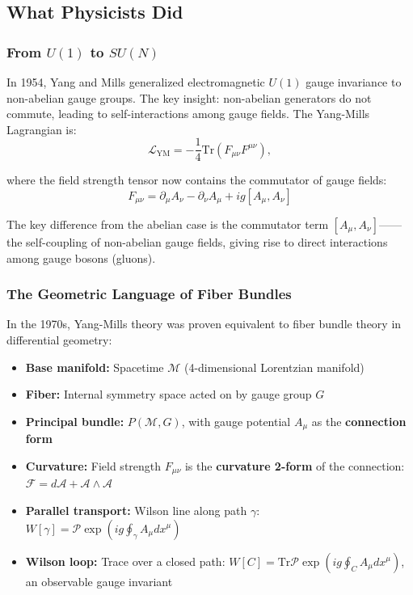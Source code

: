 \documentclass[12pt,a4paper]{article}
\theoremstyle{remark}
\newcommand{\Tr}{\mathrm{Tr}}
\begin{document}
\subsection{What Physicists Did}

\subsubsection{From $U(1)$ to $SU(N)$}

In 1954, Yang and Mills generalized electromagnetic $U(1)$ gauge invariance
to non-abelian gauge groups. The key insight: non-abelian generators do not commute,
leading to self-interactions among gauge fields. The Yang-Mills Lagrangian is:
\begin{equation}
    \mathcal{L}_{\text{YM}} = -\frac{1}{4} \Tr(F_{\mu\nu}F^{\mu\nu}),
\end{equation}

where the field strength tensor now contains the commutator of gauge fields:
\begin{equation}
    \boxed{F_{\mu\nu} = \partial_\mu A_\nu - \partial_\nu A_\mu + i g [A_\mu, A_\nu]}
    \label{eq:ym_fieldstrength}
\end{equation}

The key difference from the abelian case is the commutator term $[A_\mu, A_\nu]$——the self-coupling of non-abelian gauge fields,
giving rise to direct interactions among gauge bosons (gluons).

\subsubsection{The Geometric Language of Fiber Bundles}

In the 1970s, Yang-Mills theory was proven equivalent to fiber bundle
theory in differential geometry:

\begin{itemize}
    \item \textbf{Base manifold:} Spacetime $\mathcal{M}$ (4-dimensional Lorentzian manifold)
    \item \textbf{Fiber:} Internal symmetry space acted on by gauge group $G$
    \item \textbf{Principal bundle:} $P(\mathcal{M}, G)$, with gauge potential $A_\mu$ as the \textbf{connection form}
    \item \textbf{Curvature:} Field strength $F_{\mu\nu}$ is the \textbf{curvature 2-form} of the connection:
    $\mathcal{F} = d\mathcal{A} + \mathcal{A} \wedge \mathcal{A}$
    \item \textbf{Parallel transport:} Wilson line along path $\gamma$:
    $W[\gamma] = \mathcal{P}\exp\left(i g \oint_\gamma A_\mu dx^\mu\right)$
    \item \textbf{Wilson loop:} Trace over a closed path:
    $W[C] = \Tr \mathcal{P}\exp\left(i g \oint_C A_\mu dx^\mu\right)$,
    an observable gauge invariant
\end{itemize}
\end{document}
